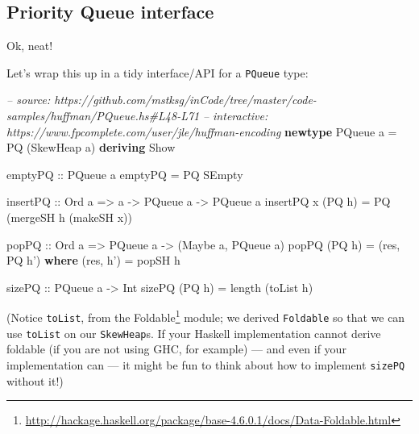 \documentclass[]{article}
\newenvironment{Shaded}{}{}
\newcommand{\KeywordTok}[1]{\textcolor[rgb]{0.00,0.44,0.13}{\textbf{#1}}}
\newcommand{\DataTypeTok}[1]{\textcolor[rgb]{0.56,0.13,0.00}{#1}}
\newcommand{\CommentTok}[1]{\textcolor[rgb]{0.38,0.63,0.69}{\textit{#1}}}
\newcommand{\OtherTok}[1]{\textcolor[rgb]{0.00,0.44,0.13}{#1}}
\newcommand{\FunctionTok}[1]{\textcolor[rgb]{0.02,0.16,0.49}{#1}}
\newcommand{\NormalTok}[1]{#1}
\renewcommand{\href}[2]{#2\footnote{\url{#1}}}
\begin{document}
\subsection{Priority Queue interface}\label{priority-queue-interface}

Ok, neat!

Let's wrap this up in a tidy interface/API for a \texttt{PQueue} type:

\begin{Shaded}
\begin{Highlighting}[]
\CommentTok{-- source: https://github.com/mstksg/inCode/tree/master/code-samples/huffman/PQueue.hs#L48-L71}
\CommentTok{-- interactive: https://www.fpcomplete.com/user/jle/huffman-encoding}
\KeywordTok{newtype} \DataTypeTok{PQueue}\NormalTok{ a }\FunctionTok{=} \DataTypeTok{PQ}\NormalTok{ (}\DataTypeTok{SkewHeap}\NormalTok{ a) }\KeywordTok{deriving} \DataTypeTok{Show}

\OtherTok{emptyPQ ::} \DataTypeTok{PQueue}\NormalTok{ a}
\NormalTok{emptyPQ }\FunctionTok{=} \DataTypeTok{PQ} \DataTypeTok{SEmpty}

\OtherTok{insertPQ ::} \DataTypeTok{Ord}\NormalTok{ a }\OtherTok{=>}\NormalTok{ a }\OtherTok{->} \DataTypeTok{PQueue}\NormalTok{ a }\OtherTok{->} \DataTypeTok{PQueue}\NormalTok{ a}
\NormalTok{insertPQ x (}\DataTypeTok{PQ}\NormalTok{ h) }\FunctionTok{=} \DataTypeTok{PQ}\NormalTok{ (mergeSH h (makeSH x))}

\OtherTok{popPQ ::} \DataTypeTok{Ord}\NormalTok{ a }\OtherTok{=>} \DataTypeTok{PQueue}\NormalTok{ a }\OtherTok{->}\NormalTok{ (}\DataTypeTok{Maybe}\NormalTok{ a, }\DataTypeTok{PQueue}\NormalTok{ a)}
\NormalTok{popPQ (}\DataTypeTok{PQ}\NormalTok{ h) }\FunctionTok{=}\NormalTok{ (res, }\DataTypeTok{PQ}\NormalTok{ h')}
  \KeywordTok{where}
\NormalTok{    (res, h') }\FunctionTok{=}\NormalTok{ popSH h}

\OtherTok{sizePQ ::} \DataTypeTok{PQueue}\NormalTok{ a }\OtherTok{->} \DataTypeTok{Int}
\NormalTok{sizePQ (}\DataTypeTok{PQ}\NormalTok{ h) }\FunctionTok{=}\NormalTok{ length (toList h)}
\end{Highlighting}
\end{Shaded}

(Notice \texttt{toList}, from the
\href{http://hackage.haskell.org/package/base-4.6.0.1/docs/Data-Foldable.html}{Foldable}
module; we derived \texttt{Foldable} so that we can use \texttt{toList} on our
\texttt{SkewHeap}s. If your Haskell implementation cannot derive foldable (if
you are not using GHC, for example) --- and even if your implementation can ---
it might be fun to think about how to implement \texttt{sizePQ} without it!)
\end{document}

